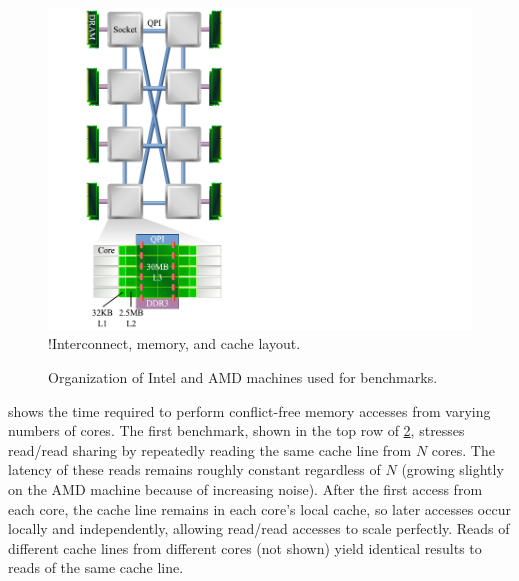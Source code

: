 \begin{figure}
  \centering
  \includegraphics{figures/machines.pdf}
  \XXX!{Interconnect, memory, and cache layout.}
  \caption{Organization of Intel and AMD machines used for benchmarks.}
  \label{fig:machines}
\end{figure}


\begin{figure}
  \centering
  
  \label{fig:cfree-cycles}
\end{figure}

 shows the time required to perform
conflict-free memory accesses from varying numbers of cores.  The
first benchmark, shown in the top row of \cref{fig:cfree-cycles},
stresses read/read sharing by repeatedly reading the same cache line
from $N$ cores.  The latency of these reads remains roughly constant
regardless of $N$ (growing slightly on the AMD machine because of
increasing noise).  After the first access from each core, the cache
line remains in each core's local cache, so later accesses occur
locally and independently, allowing read/read accesses to scale
perfectly.  Reads of different cache lines from different cores (not
shown) yield identical results to reads of the same cache line.

